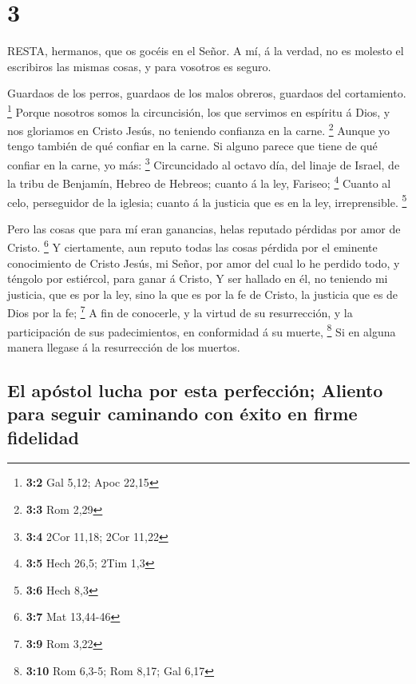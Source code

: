 \hypertarget{section-2}{%
\section{3}\label{section-2}}

 RESTA, hermanos, que os gocéis en el Señor. A mí, á la
verdad, no es molesto el escribiros las mismas cosas, y para vosotros es
seguro.

 Guardaos de los perros, guardaos de los malos obreros,
guardaos del cortamiento. \footnote{\textbf{3:2} Gal 5,12; Apoc 22,15}
 Porque nosotros somos la circuncisión, los que servimos en
espíritu á Dios, y nos gloriamos en Cristo Jesús, no teniendo confianza
en la carne. \footnote{\textbf{3:3} Rom 2,29}  Aunque yo
tengo también de qué confiar en la carne. Si alguno parece que tiene de
qué confiar en la carne, yo más: \footnote{\textbf{3:4} 2Cor 11,18; 2Cor
  11,22}  Circuncidado al octavo día, del linaje de Israel,
de la tribu de Benjamín, Hebreo de Hebreos; cuanto á la ley, Fariseo;
\footnote{\textbf{3:5} Hech 26,5; 2Tim 1,3}  Cuanto al celo,
perseguidor de la iglesia; cuanto á la justicia que es en la ley,
irreprensible. \footnote{\textbf{3:6} Hech 8,3}

 Pero las cosas que para mí eran ganancias, helas reputado
pérdidas por amor de Cristo. \footnote{\textbf{3:7} Mat 13,44-46}
 Y ciertamente, aun reputo todas las cosas pérdida por el
eminente conocimiento de Cristo Jesús, mi Señor, por amor del cual lo he
perdido todo, y téngolo por estiércol, para ganar á Cristo, 
Y ser hallado en él, no teniendo mi justicia, que es por la ley, sino la
que es por la fe de Cristo, la justicia que es de Dios por la fe;
\footnote{\textbf{3:9} Rom 3,22}  A fin de conocerle, y la
virtud de su resurrección, y la participación de sus padecimientos, en
conformidad á su muerte, \footnote{\textbf{3:10} Rom 6,3-5; Rom 8,17;
  Gal 6,17}  Si en alguna manera llegase á la resurrección
de los muertos.

\hypertarget{el-apuxf3stol-lucha-por-esta-perfecciuxf3n-aliento-para-seguir-caminando-con-uxe9xito-en-firme-fidelidad}{%
\subsection{El apóstol lucha por esta perfección; Aliento para seguir
caminando con éxito en firme
fidelidad}\label{el-apuxf3stol-lucha-por-esta-perfecciuxf3n-aliento-para-seguir-caminando-con-uxe9xito-en-firme-fidelidad}}

